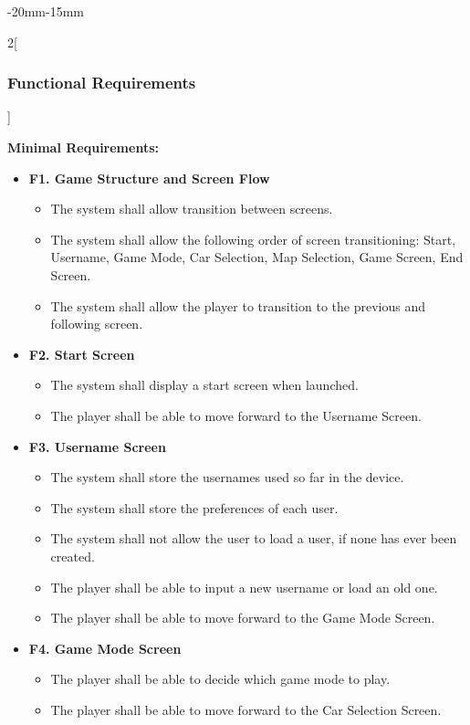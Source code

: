 \documentclass[12pt]{article}
\begin{document}
\begin{adjustwidth}{-20mm}{-15mm}
\begin{multicols}{2}[\subsubsection{Functional Requirements}]
\raggedcolumns

\noindent\textbf{Minimal Requirements:}
\begin{itemize}[leftmargin=*]
\item \textbf{F1. Game Structure and Screen Flow}
\begin{itemize}[leftmargin=*]
\item The system shall allow transition between screens.
\item The system shall allow the following order of screen transitioning: Start, Username, Game Mode, Car Selection, Map Selection, Game Screen, End Screen.
\item The system shall allow the player to transition to the previous and following screen.
\end{itemize}

\item \textbf{F2. Start Screen}
\begin{itemize}[leftmargin=*]
\item The system shall display a start screen when launched.
\item The player shall be able to move forward to the Username Screen.
\end{itemize}

\item \textbf{F3. Username Screen}
\begin{itemize}[leftmargin=*]
\item The system shall store the usernames used so far in the device.
\item The system shall store the preferences of each user.
\item The system shall not allow the user to load a user, if none has ever been created.
\item The player shall be able to input a new username or load an old one.
\item The player shall be able to move forward to the Game Mode Screen.
\end{itemize}

\item \textbf{F4. Game Mode Screen}
\begin{itemize}[leftmargin=*]
\item The player shall be able to decide which game mode to play.
\item The player shall be able to move forward to the Car Selection Screen.
\end{itemize}


\end{itemize}
\end{multicols}
\end{adjustwidth}
\end{document}
